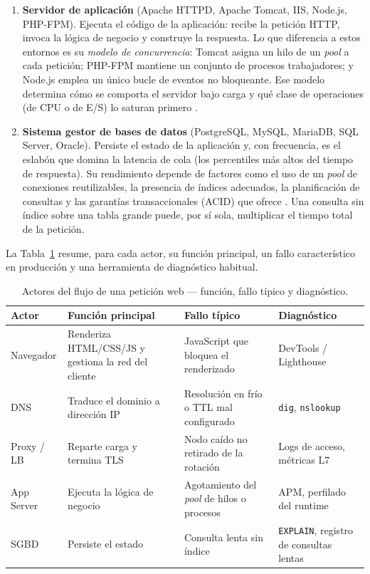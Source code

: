 \begin{enumerate}
	\item \textbf{Servidor de aplicación} (Apache HTTPD, Apache Tomcat, IIS, Node.js, PHP-FPM). Ejecuta el código de la aplicación: recibe la petición HTTP, invoca la lógica de negocio y construye la respuesta. Lo que diferencia a estos entornos es su \emph{modelo de concurrencia}: Tomcat asigna un hilo de un \emph{pool} a cada petición; PHP-FPM mantiene un conjunto de procesos trabajadores; y Node.js emplea un único bucle de eventos no bloqueante. Ese modelo determina cómo se comporta el servidor bajo carga y qué clase de operaciones (de CPU o de E/S) lo saturan primero \cite{kleppmann2017designing,grigorik2013hpbn}.
	\item \textbf{Sistema gestor de bases de datos} (PostgreSQL, MySQL, MariaDB, SQL Server, Oracle). Persiste el estado de la aplicación y, con frecuencia, es el eslabón que domina la latencia de cola (los percentiles más altos del tiempo de respuesta). Su rendimiento depende de factores como el uso de un \emph{pool} de conexiones reutilizables, la presencia de índices adecuados, la planificación de consultas y las garantías transaccionales (ACID) que ofrece \cite{kleppmann2017designing,postgresql18docs}. Una consulta sin índice sobre una tabla grande puede, por sí sola, multiplicar el tiempo total de la petición.
\end{enumerate}

La Tabla~\ref{tab:actores-web} resume, para cada actor, su función principal, un fallo característico en producción y una herramienta de diagnóstico habitual.

\begin{table}[htbp]
	\centering
	\caption{Actores del flujo de una petición web --- función, fallo típico y diagnóstico.}
	\label{tab:actores-web}
	\footnotesize
	\begin{tabularx}{\textwidth}{l X X l}
		\toprule
		\textbf{Actor} & \textbf{Función principal} & \textbf{Fallo típico} & \textbf{Diagnóstico}\\
		\midrule
		Navegador & Renderiza HTML/CSS/JS y gestiona la red del cliente & JavaScript que bloquea el renderizado & DevTools / Lighthouse\\
		DNS & Traduce el dominio a dirección IP & Resolución en frío o TTL mal configurado & \texttt{dig}, \texttt{nslookup}\\
		Proxy / LB & Reparte carga y termina TLS & Nodo caído no retirado de la rotación & Logs de acceso, métricas L7\\
		App Server & Ejecuta la lógica de negocio & Agotamiento del \emph{pool} de hilos o procesos & APM, perfilado del runtime\\
		SGBD & Persiste el estado & Consulta lenta sin índice & \texttt{EXPLAIN}, registro de consultas lentas\\
		\bottomrule
	\end{tabularx}
\end{table}

